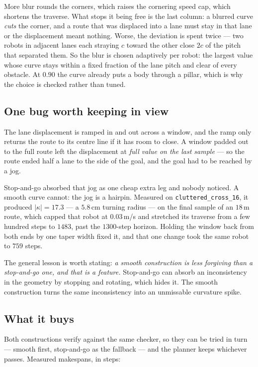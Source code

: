 \documentclass[11pt,a4paper]{article}
\begin{document}
More blur rounds the corners, which raises the cornering speed cap, which shortens the
traverse. What stops it being free is the last column: a blurred curve \emph{cuts} the
corner, and a route that was displaced into a lane must stay in that lane or the
displacement meant nothing. Worse, the deviation is spent twice --- two robots in adjacent
lanes each straying $c$ toward the other close $2c$ of the pitch that separated them. So
the blur is chosen adaptively per robot: the largest value whose curve stays within a
fixed fraction of the lane pitch and clear of every obstacle. At $0.90$ the curve already
puts a body through a pillar, which is why the choice is checked rather than tuned.

\subsection{One bug worth keeping in view}

The lane displacement is ramped in and out across a window, and the ramp only returns the
route to its centre line if it has room to close. A window padded out to the full route left
the displacement at \emph{full value on the last sample} --- so the route ended half a lane
to the side of the goal, and the goal had to be reached by a jog.

Stop-and-go absorbed that jog as one cheap extra leg and nobody noticed. A smooth curve
cannot: the jog is a hairpin. Measured on \texttt{cluttered\_cross\_16}, it produced
$|\kappa| = 17.3$ --- a $5.8$\,cm turning radius --- on the final sample of an $18$\,m
route, which capped that robot at $0.03$\,m/s and stretched its traverse from a few hundred
steps to $1483$, past the $1300$-step horizon. Holding the window back from both ends by
one taper width fixed it, and that one change took the same robot to $759$ steps.

The general lesson is worth stating: \emph{a smooth construction is less forgiving than a
stop-and-go one, and that is a feature.} Stop-and-go can absorb an inconsistency in the
geometry by stopping and rotating, which hides it. The smooth construction turns the same
inconsistency into an unmissable curvature spike.

\subsection{What it buys}

Both constructions verify against the same checker, so they can be tried in turn --- smooth
first, stop-and-go as the fallback --- and the planner keeps whichever passes. Measured
makespans, in steps:
\end{document}
